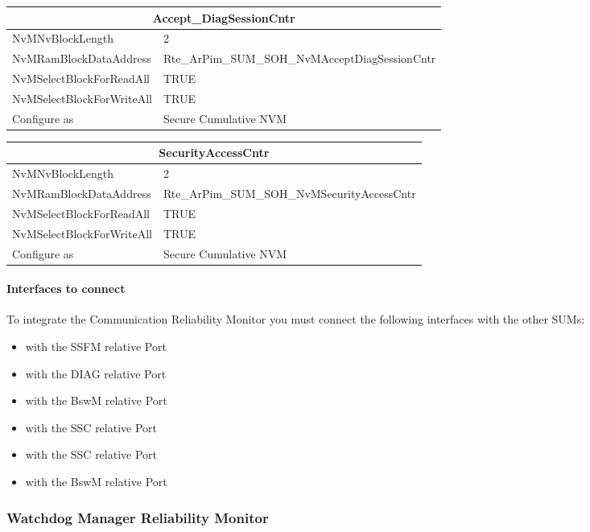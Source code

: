 \begin{tabular}{|l|p{8cm}|}\hline
\multicolumn{2}{|c|}{\textbf{Accept\_DiagSessionCntr}}\\\hline
NvMNvBlockLength&2\\\hline
NvMRamBlockDataAddress&Rte\_ArPim\_SUM\_SOH\_NvMAcceptDiagSessionCntr\\\hline
NvMSelectBlockForReadAll&TRUE\\\hline
NvMSelectBlockForWriteAll&TRUE\\\hline
Configure as&Secure Cumulative NVM\\\hline
\end{tabular}

\begin{tabular}{|l|p{8cm}|}\hline
\multicolumn{2}{|c|}{\textbf{SecurityAccessCntr}}\\\hline
NvMNvBlockLength&2\\\hline
NvMRamBlockDataAddress&Rte\_ArPim\_SUM\_SOH\_NvMSecurityAccessCntr\\\hline
NvMSelectBlockForReadAll&TRUE\\\hline
NvMSelectBlockForWriteAll&TRUE\\\hline
Configure as&Secure Cumulative NVM\\\hline
\end{tabular}

\paragraph{Interfaces to connect}
To integrate the Communication Reliability Monitor you must connect the following interfaces with the other SUMs:

\begin{itemize}
    \item {} with the SSFM relative Port
    \item {} with the DIAG relative Port
    \item {} with the BswM relative Port
    \item {} with the SSC relative Port
    \item {} with the SSC relative Port
    \item {} with the BswM relative Port
\end{itemize}

\subsubsection{Watchdog Manager Reliability Monitor}

